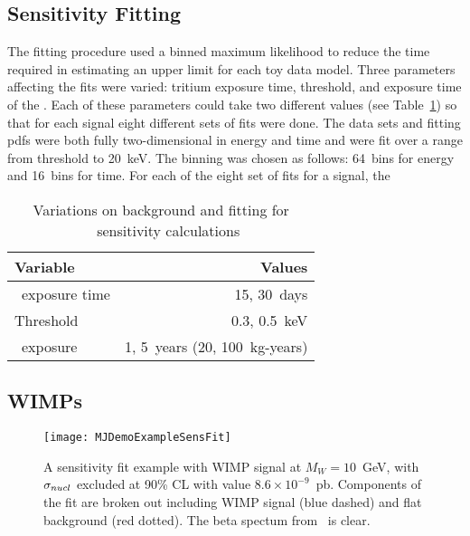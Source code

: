 	

		\subsection{Sensitivity Fitting}
		\label{sec:MJSensitivityFitting}
	
	The fitting procedure used a binned maximum likelihood to reduce the time required in estimating an upper limit for each toy data model.  Three parameters affecting the fits were varied: tritium exposure time, threshold, and exposure time of the \minmod.  Each of these parameters could take two different values (see Table~\ref{tab:SensFitValues}) so that for each signal eight different sets of fits were done.  The data sets and fitting pdfs were both fully two-dimensional in energy and time and were fit over a range from threshold to 20~keV.  The binning was chosen as follows: 64~bins for energy and 16~bins for time.  For each of the eight set of fits for a signal, the 
	
			\begin{table}
				\centering
				\begin{tabular}{l r}
					\toprule
					Variable & Values \\
					\midrule
					\hthree~exposure time & 15, 30~days \\
					Threshold & 0.3, 0.5~keV \\
					\minmod~exposure & 1, 5~years (20, 100~kg-years) \\
					\bottomrule 
				\end{tabular}				
				\caption[Variations on background and fitting for \MJ~\minmod~sensitivity calculations]
				{Variations on background and fitting for \MJ~\minmod~sensitivity calculations}
				\label{tab:SensFitValues}
			\end{table}		
		
		\subsection{WIMPs}
		\label{sec:MJSensitivityToWIMP}
		\cite{Avi92}
			\begin{figure}
				\centering
				\texttt{[image: MJDemoExampleSensFit]}
				\caption[\MJ~\minmod WIMP sensitivity fit example.]{A sensitivity fit example with WIMP  
				signal at $M_{W}=10$~GeV, with $\sigma_{nucl}$ excluded at 90\% CL with value
				 $8.6\times10^{-9}$~pb.  Components of the fit are broken out including WIMP 
				 signal (blue dashed) and flat background (red dotted).  The beta spectum from \hthree~is clear.}
				\label{fig:MJSensitivityToWIMPExample}
			\end{figure}
	
